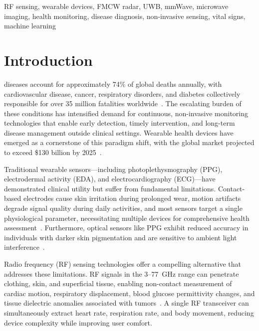 \documentclass[journal,twoside]{IEEEtran}
\begin{document}
\begin{IEEEkeywords}
RF sensing, wearable devices, FMCW radar, UWB, mmWave, microwave imaging, health monitoring, disease diagnosis, non-invasive sensing, vital signs, machine learning
\end{IEEEkeywords}

\section{Introduction}
\label{sec:introduction}

 diseases account for approximately 74\% of global deaths annually, with cardiovascular disease, cancer, respiratory disorders, and diabetes collectively responsible for over 35 million fatalities worldwide~\cite{ref_who2024}. The escalating burden of these conditions has intensified demand for continuous, non-invasive monitoring technologies that enable early detection, timely intervention, and long-term disease management outside clinical settings. Wearable health devices have emerged as a cornerstone of this paradigm shift, with the global market projected to exceed \$130 billion by 2025~\cite{ref_market2024}.

Traditional wearable sensors---including photoplethysmography (PPG), electrodermal activity (EDA), and electrocardiography (ECG)---have demonstrated clinical utility but suffer from fundamental limitations. Contact-based electrodes cause skin irritation during prolonged wear, motion artifacts degrade signal quality during daily activities, and most sensors target a single physiological parameter, necessitating multiple devices for comprehensive health assessment~\cite{ref_wearable_cardio2025}. Furthermore, optical sensors like PPG exhibit reduced accuracy in individuals with darker skin pigmentation and are sensitive to ambient light interference~\cite{ref_bp_wearable2023}.

Radio frequency (RF) sensing technologies offer a compelling alternative that addresses these limitations. RF signals in the \SI{3}{}--\SI{77}{\giga\hertz} range can penetrate clothing, skin, and superficial tissue, enabling non-contact measurement of cardiac motion, respiratory displacement, blood glucose permittivity changes, and tissue dielectric anomalies associated with tumors~\cite{ref_mlrf2025}. A single RF transceiver can simultaneously extract heart rate, respiration rate, and body movement, reducing device complexity while improving user comfort.
\end{document}
